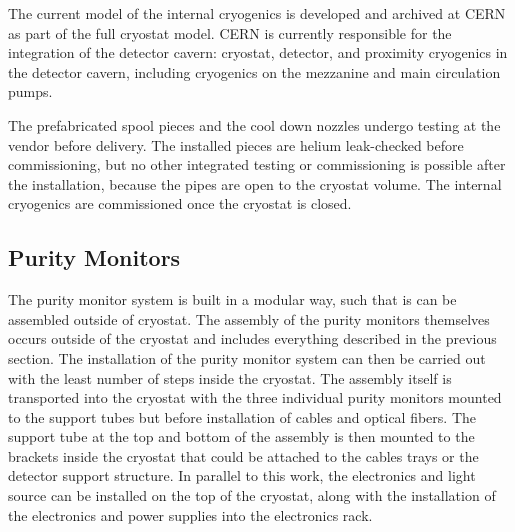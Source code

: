 The current \threed model of the internal cryogenics is developed and archived at CERN as part of the full cryostat model. CERN is currently responsible for the integration of the detector cavern: cryostat, detector, and proximity cryogenics in the detector cavern, including cryogenics on the mezzanine and main \lar circulation pumps.

The prefabricated spool pieces and the cool down nozzles undergo testing at the vendor  before delivery. The installed pieces are helium leak-checked before commissioning, but no other integrated testing or commissioning is possible after the installation, because the pipes are open to the cryostat volume. The internal cryogenics are commissioned once the cryostat is closed.


\subsection{Purity Monitors}
\label{sec:fdgen-slow-cryo-instal-pm}

The purity monitor system is built in a modular way, such that is can be assembled outside of  cryostat.  The assembly of the purity monitors themselves occurs outside of the cryostat and includes everything described in the previous section.  The installation of the purity monitor system can then be carried out with the least number of steps inside the cryostat.  The assembly itself is transported into the cryostat with the three individual purity monitors mounted to the support tubes but before installation of  cables and optical fibers. The support tube at the top and bottom of the assembly is then mounted to the brackets inside the cryostat that could be attached to the cables trays or the detector support structure.  In parallel to this work, the  electronics and light source can be installed on the top of the cryostat, along with the installation of the electronics and power supplies into the electronics rack.  

